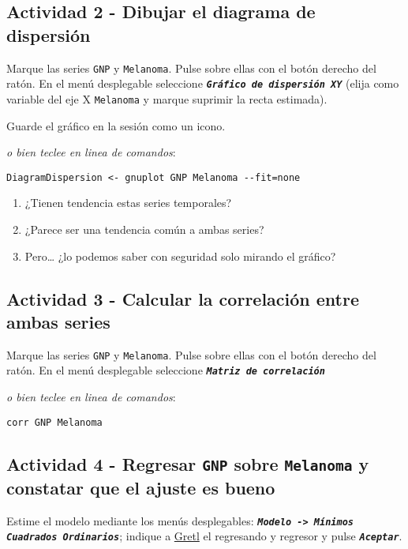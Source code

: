 \documentclass[11pt]{article}
\begin{document}
\vspace{-3pt}

\subsection{Actividad 2 - Dibujar el diagrama de dispersión}
\label{sec:org2838ff8}
Marque las series \texttt{GNP} y \texttt{Melanoma}. Pulse sobre ellas con el botón
derecho del ratón. En el menú desplegable seleccione \textbf{\emph{\texttt{Gráfico de
dispersión XY}}} (elija como variable del eje X \texttt{Melanoma} y marque
suprimir la recta estimada).

Guarde el gráfico en la sesión como un icono.

{\vspace{1pt} \footnotesize \color{gray!70!black}
\emph{o bien teclee en linea de comandos}:
\begin{verbatim}
DiagramDispersion <- gnuplot GNP Melanoma --fit=none
\end{verbatim}
}

\vspace{-3pt}

\begin{enumerate}
\item ¿Tienen tendencia estas series temporales?
\item ¿Parece ser una tendencia común a ambas series?
\item Pero\ldots{} ¿lo podemos saber con seguridad solo mirando el gráfico?
\end{enumerate}

\subsection{Actividad 3 - Calcular la correlación entre ambas series}
\label{sec:org0ed41c3}
Marque las series \texttt{GNP} y \texttt{Melanoma}. Pulse sobre ellas con el botón
derecho del ratón. En el menú desplegable seleccione \textbf{\emph{\texttt{Matriz de
correlación}}}

{\vspace{0pt} \footnotesize \color{gray!70!black}
\emph{o bien teclee en linea de comandos}:
\begin{verbatim}
corr GNP Melanoma
\end{verbatim}
}

\subsection{Actividad 4 - Regresar \texttt{GNP} sobre \texttt{Melanoma} y constatar que el ajuste es bueno}
\label{sec:org70554fa}
Estime el modelo mediante los menús desplegables: \textbf{\emph{\texttt{Modelo -> Mínimos
  Cuadrados Ordinarios}}}; indique a \href{https://gretl.sourceforge.net/es.html}{Gretl} el regresando y regresor y
  pulse \textbf{\emph{\texttt{Aceptar}}}.
\end{document}
